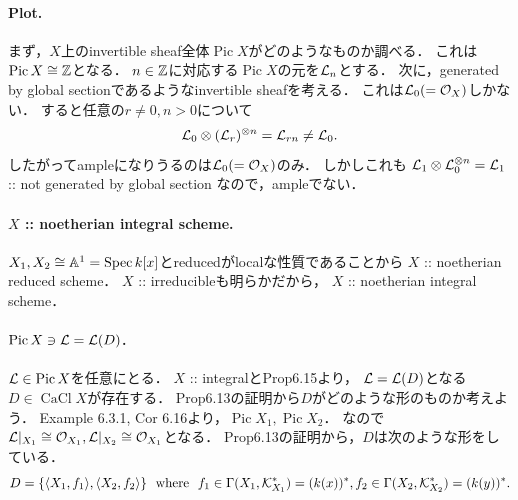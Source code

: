 \documentclass[a4paper]{jsarticle}
\newcommand{\CaCl}{\operatorname{CaCl}}
\newcommand{\Pic}{\operatorname{Pic}}
\begin{document}
    \paragraph{Plot.}
    まず，$X$上のinvertible sheaf全体$\Pic X$がどのようなものか調べる．
    これは$\Pic X \iso \Z$となる．
    $n \in \mathbb{Z}$に対応する$\Pic X$の元を$\mathcal{L}_n$とする．
    次に，generated by global sectionであるようなinvertible sheafを考える．
    これは$\mathcal{L}_0(=\mathcal{O}_X)$しかない．
    すると任意の$r \neq 0, n>0$について
    \[ \mathcal{L}_0 \otimes (\mathcal{L}_r)^{\otimes n}=\mathcal{L}_{rn} \neq \mathcal{L}_0. \]
    したがってampleになりうるのは$\mathcal{L}_0(=\mathcal{O}_X)$のみ．
    しかしこれも
    $\mathcal{L}_1 \otimes \mathcal{L}_0^{\otimes n}=\mathcal{L}_1$ :: not generated by global section
    なので，ampleでない．

    \paragraph{$X$ :: noetherian integral scheme.}
    $X_1, X_2 \cong \mathbb{A}^1=\operatorname{Spec} k[x]$とreducedがlocalな性質であることから
    $X$ :: noetherian reduced scheme．
    $X$ :: irreducibleも明らかだから，
    $X$ :: noetherian integral scheme．

    \paragraph{$\Pic X \ni \shL=\shL(D)$.}
    $\shL \in \Pic X$を任意にとる．
    $X$ :: integralとProp6.15より，
    $\mathcal{L}=\mathcal{L}(D)$となる$D \in \CaCl X$が存在する．
    Prop6.13の証明から$D$がどのような形のものか考えよう．
    Example 6.3.1, Cor 6.16より，$\Pic X_1, \Pic X_2$．
    なので$\mathcal{L}|_{X_1} \cong \mathcal{O}_{X_1}, \mathcal{L}|_{X_2} \cong \mathcal{O}_{X_1}$となる．
    Prop6.13の証明から，$D$は次のような形をしている．
    \[
        D=\{ \langle X_1,f_1 \rangle, \langle X_2,f_2 \rangle \}
        ~~\text{where}~~
        f_1 \in \Gamma(X_1, \mathcal{K}_{X_1}^*)=(k(x))^*,
        f_2 \in \Gamma(X_2, \mathcal{K}_{X_2}^*)=(k(y))^*.
    \]
\end{document}
